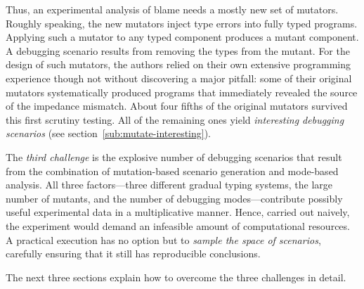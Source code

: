 Thus, an experimental analysis of blame needs a mostly new set of mutators.
Roughly speaking, the new mutators inject type errors into fully typed programs.
Applying such a mutator to any typed component produces a mutant component.  A
debugging scenario results from removing the types from the mutant. For the
design of such mutators, the authors relied on their own extensive programming
experience though not without discovering a major pitfall: some of their
original mutators systematically produced programs that immediately revealed the
source of the impedance mismatch. About four fifths of the original mutators
survived this first scrutiny testing. All of the remaining ones yield {\em
interesting debugging scenarios\/} (see section~\ref{sub:mutate-interesting}).

The {\em third challenge\/} is the explosive number of debugging scenarios that
result from the combination of mutation-based scenario generation and mode-based
analysis. All three factors---three different gradual typing systems, the large
number of mutants, and the number of debugging modes---contribute possibly
useful experimental data in a multiplicative manner. Hence, carried out naively,
the experiment would demand an infeasible amount of computational
resources.  A practical execution has no option but to {\em sample the space of
scenarios\/}, carefully ensuring that it still has reproducible
conclusions.

The next three sections explain how to overcome the three challenges
in detail. 
